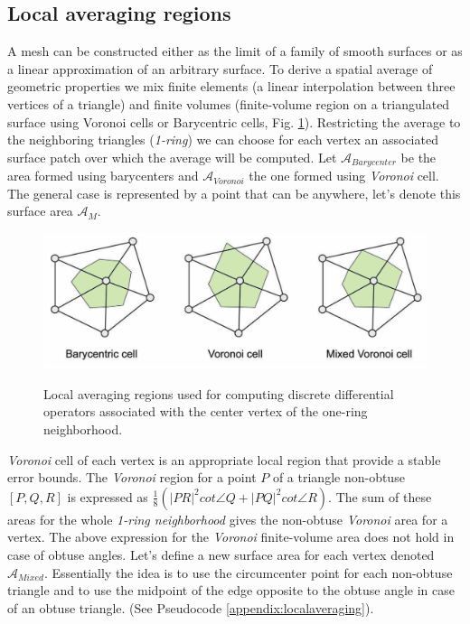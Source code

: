 \subsection{Local averaging regions} \label{section:localaveraging}
A mesh can be constructed either as the limit of a family of smooth surfaces or as a linear approximation of an arbitrary surface. To derive a spatial average of geometric properties we mix finite elements (a linear interpolation between three vertices of a triangle) and finite volumes (finite-volume region on a triangulated surface using Voronoi cells or Barycentric cells, Fig. \ref{fig:localregions}). Restricting the average to the neighboring triangles (\textit{1-ring}) we can choose for each vertex an associated surface patch over which the average will be computed.
Let $\mathcal{A}_{Barycenter}$ be the area formed using barycenters and $\mathcal{A}_{Voronoi}$ the one formed using \textit{Voronoi} cell. The general case is represented by a point that can be anywhere, let's denote this surface area $\mathcal{A}_M$.

\begin{figure}[!h]
    \centering
    \includegraphics[scale=0.35]{images/localregions.png}
    \label{fig:localregions}
    \caption{Local averaging regions used for computing discrete differential operators associated with the center vertex of the one-ring neighborhood.\cite{polygonmeshprocessing}}
\end{figure}
\textit{Voronoi} cell of each vertex is an appropriate local region that provide a stable error bounds.
The \textit{Voronoi} region for a point $P$ of a triangle non-obtuse $[P, Q, R]$ is expressed as $\frac{1}{8}(| PR|^2 cot \angle Q + |PQ |^2 cot \angle R)$. The sum of these areas for the whole \textit{1-ring neighborhood} gives the non-obtuse \textit{Voronoi} area for a vertex. The above expression for the \textit{Voronoi} finite-volume area does not hold in case of obtuse angles. Let's define a new surface area for each vertex denoted $\mathcal{A}_{Mixed}$. Essentially the idea is to use the circumcenter point for each non-obtuse triangle and to use the midpoint of the edge opposite to the obtuse angle in case of an obtuse triangle. (See Pseudocode \ref{appendix:localaveraging}).\cite{meshlab}

